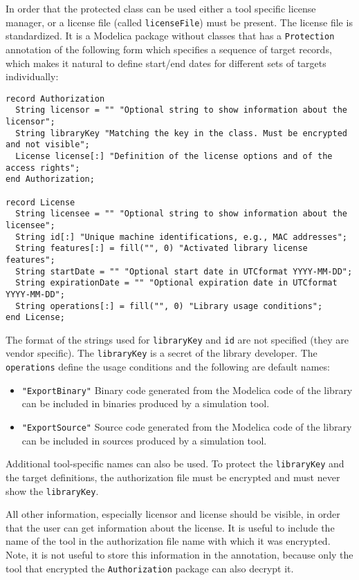 In order that the protected class can be used either a tool specific license manager, or a license file (called \lstinline!licenseFile!) must be present.
The license file is standardized.
It is a Modelica package without classes that has a \lstinline!Protection! annotation of the following form which specifies a sequence of target records, which makes it natural to define start/end dates for different sets of targets individually:
\begin{lstlisting}[language=modelica]
record Authorization
  String licensor = "" "Optional string to show information about the licensor";
  String libraryKey "Matching the key in the class. Must be encrypted and not visible";
  License license[:] "Definition of the license options and of the access rights";
end Authorization;

record License
  String licensee = "" "Optional string to show information about the licensee";
  String id[:] "Unique machine identifications, e.g., MAC addresses";
  String features[:] = fill("", 0) "Activated library license features";
  String startDate = "" "Optional start date in UTCformat YYYY-MM-DD";
  String expirationDate = "" "Optional expiration date in UTCformat YYYY-MM-DD";
  String operations[:] = fill("", 0) "Library usage conditions";
end License;
\end{lstlisting}%

The format of the strings used for \lstinline!libraryKey! and \lstinline!id! are not specified (they are vendor specific).
The \lstinline!libraryKey! is a secret of the library developer.
The \lstinline!operations! define the usage conditions and the following are default names:
\begin{itemize}
\item
  \lstinline!"ExportBinary"! Binary code generated from the Modelica code of the library can be included in binaries produced by a simulation tool.
\item
  \lstinline!"ExportSource"! Source code generated from the Modelica code of the library can be included in sources produced by a simulation tool.
\end{itemize}

Additional tool-specific names can also be used.
To protect the \lstinline!libraryKey! and the target definitions, the authorization file must be encrypted and must never show the \lstinline!libraryKey!.

\begin{nonnormative}
All other information, especially licensor and license should be visible, in order that the user can get information about the license.
It is useful to include the name of the tool in the authorization file name with which it was encrypted.
Note, it is not useful to store this information in the annotation, because only the tool that encrypted the \lstinline!Authorization! package can also decrypt it.
\end{nonnormative}

